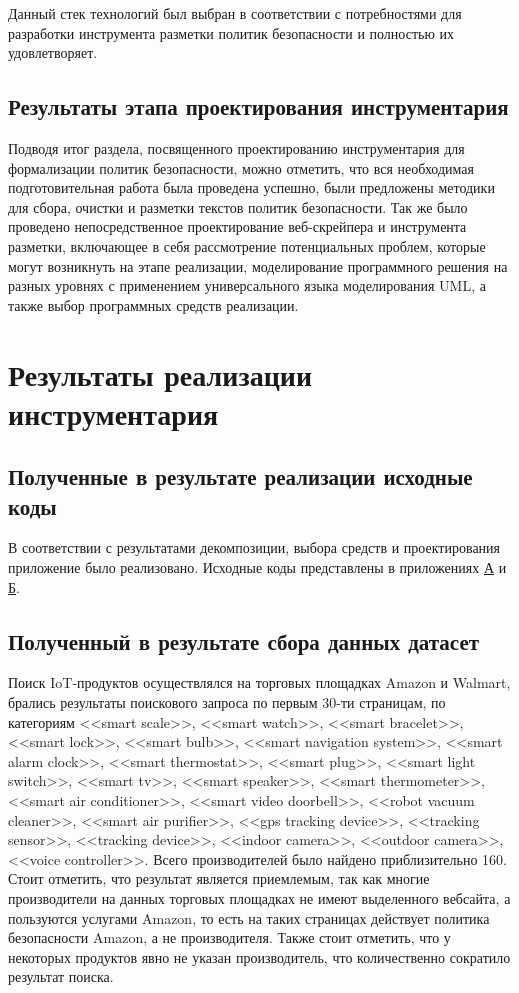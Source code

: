 \documentclass[../main]{subfiles}
\begin{document}
Данный стек технологий был выбран в соответствии с потребностями для разработки инструмента разметки политик безопасности и полностью их удовлетворяет.

\subsection{Результаты этапа проектирования инструментария}
Подводя итог раздела, посвященного проектированию инструментария для формализации политик безопасности, можно отметить, что вся необходимая подготовительная работа была проведена успешно, были предложены методики для сбора, очистки и разметки текстов политик безопасности. Так же было проведено непосредственное проектирование веб-скрейпера и инструмента разметки, включающее в себя рассмотрение потенциальных проблем, которые могут возникнуть на этапе реализации, моделирование программного решения на разных уровнях с применением универсального языка моделирования UML, а также выбор программных средств реализации.

\newpage
\section{Результаты реализации инструментария}

\subsection{Полученные в результате реализации исходные коды}
В соответствии с результатами декомпозиции, выбора средств и проектирования приложение было реализовано. Исходные коды представлены в приложениях \hyperref[sec:appendix1]{А} и \hyperref[sec:appendix2]{Б}.

\subsection{Полученный в результате сбора данных датасет}
Поиск IoT-продуктов осуществлялся на торговых площадках Amazon и Walmart, брались результаты поискового запроса по первым 30-ти страницам, по категориям <<smart scale>>, <<smart watch>>, <<smart bracelet>>, <<smart lock>>, <<smart bulb>>, <<smart navigation system>>, <<smart alarm clock>>, <<smart thermostat>>, <<smart plug>>, <<smart light switch>>, <<smart tv>>, <<smart speaker>>, <<smart thermometer>>, <<smart air conditioner>>, <<smart video doorbell>>, <<robot vacuum cleaner>>, <<smart air pu\-ri\-fi\-er>>, <<gps tracking device>>, <<tracking sensor>>, <<tracking device>>, <<indoor came\-ra>>, <<outdoor camera>>, <<voice controller>>. Всего производителей было найдено приблизительно 160. Стоит отметить, что результат является приемлемым, так как многие производители на данных торговых площадках не имеют выделенного вебсайта, а пользуются услугами Amazon, то есть на таких страницах действует политика безопасности Amazon, а не производителя. Также стоит отметить, что у некоторых продуктов явно не указан производитель, что количественно сократило результат поиска.
\end{document}
